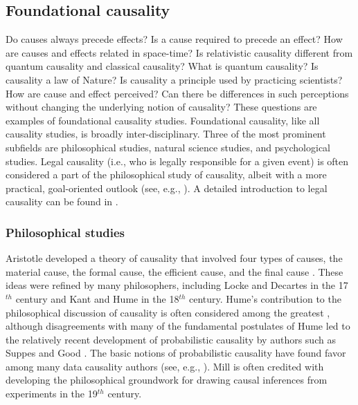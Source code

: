 \documentclass{article}[10pt]
\begin{document}
\subsection{Foundational causality}
Do causes always precede effects?  Is a cause required to precede an effect?  How are causes and effects related in space-time?  Is relativistic causality different from quantum causality and classical causality?  What is quantum causality?  Is causality a law of Nature?  Is causality a principle used by practicing scientists?  How are cause and effect perceived?  Can there be differences in such perceptions without changing the underlying notion of causality?  These questions are examples of foundational causality studies.  Foundational causality, like all causality studies, is broadly inter-disciplinary.  Three of the most prominent subfields are philosophical studies, natural science studies, and psychological studies.  Legal causality (i.e., who is legally responsible for a given event) is often considered a part of the philosophical study of causality, albeit with a more practical, goal-oriented outlook (see, e.g., \cite{Honore2010,Young2007}).  A detailed introduction to legal causality can be found in \cite{Illari2014}.

\subsubsection{Philosophical studies} 
Aristotle developed a theory of causality that involved four types of causes, the material cause, the formal cause, the efficient cause, and the final cause \cite{Falcon2008,Evans1959,Holland1986,Zheng2010}.  These ideas were refined by many philosophers, including Locke \cite{Locke1700} and Decartes \cite{Descartes1830} in the 17$^{th}$ century and Kant \cite{Kant1855} and Hume \cite{Hume1888} in the 18$^{th}$ century.  Hume's contribution to the philosophical discussion of causality is often considered among the greatest \cite{Holland1986,Zheng2010,Pearl2000,Illari2014}, although disagreements with many of the fundamental postulates of Hume led to the relatively recent development of probabilistic causality by authors such as Suppes \cite{Suppes1970} and Good \cite{Good1984}.  The basic notions of probabilistic causality have found favor among many data causality authors (see, e.g., \cite{Zheng2010,Illari2014,Kleinberg2012}).  Mill is often credited with developing the philosophical groundwork for drawing causal inferences from experiments \cite{Mill1858} in the 19$^{th}$ century.  
\end{document}
